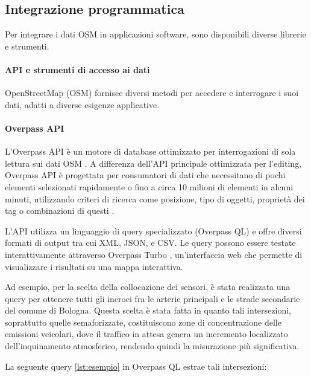 \subsection{Integrazione programmatica}

Per integrare i dati OSM in applicazioni software, sono disponibili diverse librerie e strumenti.

\paragraph{API e strumenti di accesso ai dati}

OpenStreetMap (OSM) fornisce diversi metodi per accedere e interrogare i suoi dati, adatti a diverse esigenze applicative.

\paragraph{Overpass API}
L'Overpass API è un motore di database ottimizzato per interrogazioni di sola lettura sui dati OSM \cite{overpass2024}. A differenza dell'API principale ottimizzata per l'editing, Overpass API è progettata per consumatori di dati che necessitano di pochi elementi selezionati rapidamente o fino a circa 10 milioni di elementi in alcuni minuti, utilizzando criteri di ricerca come posizione, tipo di oggetti, proprietà dei tag o combinazioni di questi \cite{overpass2024}.

L'API utilizza un linguaggio di query specializzato (Overpass QL) e offre diversi formati di output tra cui XML, JSON, e CSV. Le query possono essere testate interattivamente attraverso Overpass Turbo \cite{overpassturbo2024}, un'interfaccia web che permette di visualizzare i risultati su una mappa interattiva.

Ad esempio, per la scelta della collocazione dei sensori, è stata realizzata una query per ottenere tutti gli incroci fra le arterie principali e le strade secondarie del comune di Bologna. Questa scelta è stata fatta in quanto tali intersezioni, soprattutto quelle semaforizzate, costituiscono zone di concentrazione delle emissioni veicolari, dove il traffico in attesa genera un incremento localizzato dell'inquinamento atmosferico, rendendo quindi la misurazione più significativa.

La seguente query \ref{lst:esempio} in Overpass QL estrae tali intersezioni:

